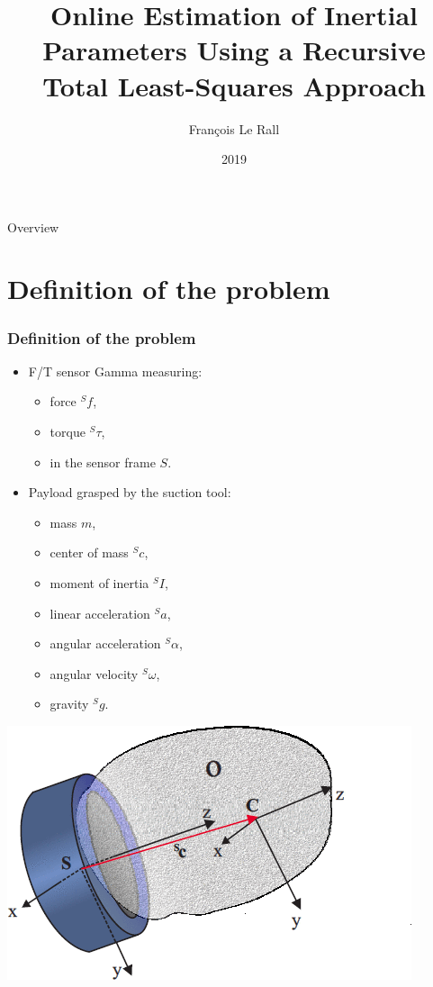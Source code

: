 \documentclass[usenames,dvipsnames]{beamer}
\title{Online Estimation of Inertial Parameters Using a Recursive Total Least-Squares Approach}
\author{François Le Rall}
\institute{Nomagic – Robotic Seminar}
\date{2019}
\begin{document}
\frame{\titlepage}

\begin{frame}{Overview}
 \tableofcontents

\end{frame}


\section{Definition of the problem}

\begin{frame}
 \frametitle{Definition of the problem}

 \begin{minipage}{.5\textwidth}
  \begin{itemize}
   \item F/T sensor Gamma measuring:
         \begin{itemize}
          \item force ${}^S f$,
          \item torque ${}^S \tau$,
          \item in the sensor frame $S$.
         \end{itemize}
   \item Payload grasped by the suction tool:
         \begin{itemize}
          \item mass $m$,
          \item center of mass ${}^S c$,
          \item moment of inertia ${}^S I$,
          \item linear acceleration ${}^S a$,
          \item angular acceleration ${}^S \alpha$,
          \item angular velocity ${}^S \omega$,
          \item gravity ${}^S g$.
         \end{itemize}
  \end{itemize}
 \end{minipage}%
 \begin{minipage}{0.5\textwidth}
  \centering
  \includegraphics[scale=0.4]{images/scheme.png}
 \end{minipage}

\end{frame}
\end{document}
